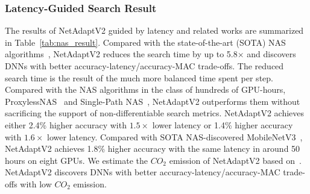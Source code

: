\subsubsection{Latency-Guided Search Result}
\label{subsec:latency_guided_search_result}

The results of NetAdaptV2 guided by latency and related works are summarized in Table~\ref{tab:nas_result}. Compared with the state-of-the-art (SOTA) NAS algorithms~\cite{cai2020once, yu2020bignas}, NetAdaptV2 reduces the search time by up to 5.8$\times$ and discovers DNNs with better accuracy-latency/accuracy-MAC trade-offs. The reduced search time is the result of the much more balanced time spent per step. Compared with the NAS algorithms in the class of hundreds of GPU-hours, ProxylessNAS~\cite{cai2018proxylessnas} and Single-Path NAS~\cite{stamoulis2019singlepathautoml}, NetAdaptV2 outperforms them without sacrificing the support of non-differentiable search metrics. NetAdaptV2 achieves either 2.4\% higher accuracy with $1.5\times$ lower latency or 1.4\% higher accuracy with $1.6\times$ lower latency. Compared with SOTA NAS-discovered MobileNetV3~\cite{Howard_2019_ICCV}, NetAdaptV2 achieves 1.8\% higher accuracy with the same latency in around 50 hours on eight GPUs. We estimate the $CO_2$ emission of NetAdaptV2 based on~\cite{strubell_2019_energy}. NetAdaptV2 discovers DNNs with better accuracy-latency/accuracy-MAC trade-offs with low $CO_2$ emission.

